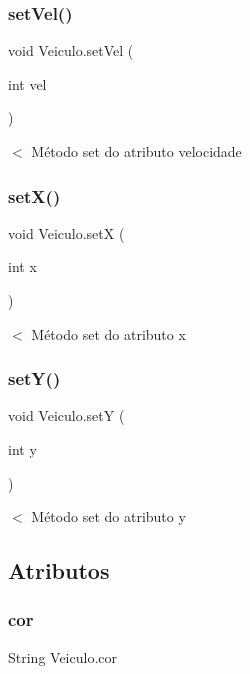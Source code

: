 \subsubsection{\texorpdfstring{set\+Vel()}{setVel()}}
{\footnotesize\ttfamily void Veiculo.\+set\+Vel (\begin{DoxyParamCaption}\item[{int}]{vel }\end{DoxyParamCaption})}

$<$ Método set do atributo velocidade \mbox{\label{class_veiculo_a84b2207a013e6cd869959b73a93864b8}} 
\subsubsection{\texorpdfstring{set\+X()}{setX()}}
{\footnotesize\ttfamily void Veiculo.\+setX (\begin{DoxyParamCaption}\item[{int}]{x }\end{DoxyParamCaption})}

$<$ Método set do atributo x \mbox{\label{class_veiculo_a57cb54424b47643d8b388c72dbaf43b1}} 
\subsubsection{\texorpdfstring{set\+Y()}{setY()}}
{\footnotesize\ttfamily void Veiculo.\+setY (\begin{DoxyParamCaption}\item[{int}]{y }\end{DoxyParamCaption})}

$<$ Método set do atributo y 

\subsection{Atributos}
\mbox{\label{class_veiculo_a6bc5886e61340672e69bd638936ec1d5}} 
\subsubsection{\texorpdfstring{cor}{cor}}
{\footnotesize\ttfamily String Veiculo.\+cor\hspace{0.3cm}{\ttfamily [private]}}



